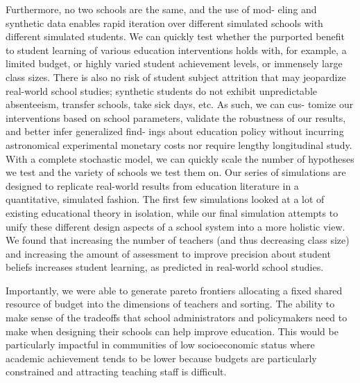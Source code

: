 \documentclass[10pt, letterpaper]{article}
\begin{document}
Furthermore, no two schools are the same, and the use of mod- eling and
synthetic data enables rapid iteration over different simulated schools
with different simulated students. We can quickly test whether the
purported benefit to student learning of various education interventions
holds with, for example, a limited budget, or highly varied student
achievement levels, or immensely large class sizes. There is also no
risk of student subject attrition that may jeopardize real-world school
studies; synthetic students do not exhibit unpredictable absenteeism,
transfer schools, take sick days, etc. As such, we can cus- tomize our
interventions based on school parameters, validate the robustness of our
results, and better infer generalized find- ings about education policy
without incurring astronomical experimental monetary costs nor require
lengthy longitudinal study. With a complete stochastic model, we can
quickly scale the number of hypotheses we test and the variety of
schools we test them on. Our series of simulations are designed to
replicate real-world results from education literature in a
quantitative, simulated fashion. The first few simulations looked at a
lot of existing educational theory in isolation, while our final
simulation attempts to unify these different design aspects of a school
system into a more holistic view. We found that increasing the number of
teachers (and thus decreasing class size) and increasing the amount of
assessment to improve precision about student beliefs increases student
learning, as predicted in real-world school studies.

Importantly, we were able to generate pareto frontiers allocating a
fixed shared resource of budget into the dimensions of teachers and
sorting. The ability to make sense of the tradeoffs that school
administrators and policymakers need to make when designing their
schools can help improve education. This would be particularly impactful
in communities of low socioeconomic status where academic achievement
tends to be lower because budgets are particularly constrained and
attracting teaching staff is difficult.
\end{document}
